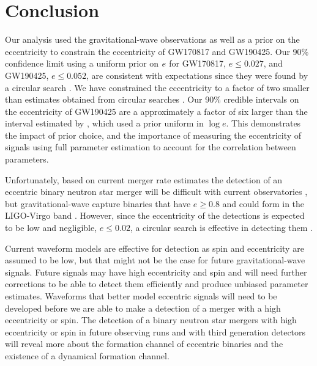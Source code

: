 \section{Conclusion}
Our analysis used the gravitational-wave observations as well as a prior on the eccentricity to constrain the eccentricity of GW170817 and GW190425. Our 90\% confidence limit using a uniform prior on $e$ for GW170817, $e \leq 0.027$, and GW190425, $e \leq 0.052$, are consistent with expectations since they were found by a circular search \cite{Peters:1964zz}. We have constrained the eccentricity to a factor of two smaller than estimates obtained from circular searches \cite{Brown:2009ng,Huerta:2013qb}. Our 90\% credible intervals on the eccentricity of GW190425 are a approximately a factor of six larger than the interval estimated by \cite{10.1093/mnrasl/slaa084}, which used a prior uniform in $\log e$. This demonstrates the impact of prior choice, and the importance of measuring the eccentricity of signals using full parameter estimation to account for the correlation between parameters.

Unfortunately, based on current merger rate estimates the detection of an eccentric binary neutron star merger will be difficult with current observatories \cite{Lee:2009ca,Ye:2019xvf,Nitz:2019spj}, but gravitational-wave capture binaries that have $e \geq 0.8$ and could form in the LIGO-Virgo band \cite{Rodriguez:2018pss,Takatsy:2018euo}. However, since the eccentricity of the detections is expected to be low and negligible, $e \leq 0.02$, a circular search is effective in detecting them \cite{Brown:2009ng,Huerta:2013qb}. 

Current waveform models are effective for detection as spin and eccentricity are assumed to be low, but that might not be the case for future gravitational-wave signals. Future signals may have high eccentricity and spin and will need further corrections to be able to detect them efficiently and produce unbiased parameter estimates. Waveforms that better model eccentric signals will need to be developed before we are able to make a detection of a merger with a high eccentricity or spin. The detection of a binary neutron star mergers with high eccentricity or spin in future observing runs and with third generation detectors will reveal more about the formation channel of eccentric binaries and the existence of a dynamical formation channel. 